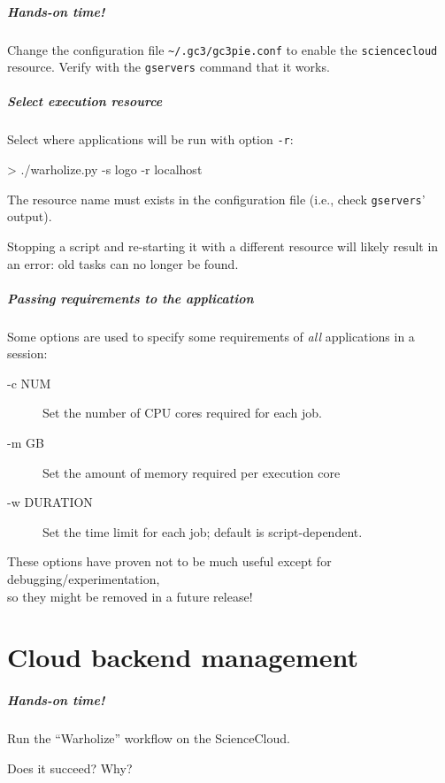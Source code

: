 \documentclass[english,serif,mathserif,usenames,dvipsnames]{beamer}
\begin{document}
\begin{frame}
  \frametitle{Hands-on time!}
  \begin{exercise}
    Change the configuration file
    \texttt{{\textasciitilde}/.gc3/gc3pie.conf} to enable the
    \texttt{sciencecloud} resource.  Verify with the \texttt{gservers}
    command that it works.
  \end{exercise}
\end{frame}


\begin{frame}
  \frametitle{Select execution resource}

  Select where applications will be run with option \texttt{-r}:
\begin{semiverbatim}
    > ./warholize.py -s logo -r localhost
\end{semiverbatim}

  \+ The resource name must exists in the configuration file (i.e.,
  check \texttt{gservers}' output).

  \+ Stopping a script and re-starting it with a different resource
  will likely result in an error: old tasks can no longer be found.
\end{frame}


\begin{frame}
  \frametitle{Passing requirements to the application}
  Some options are used to specify some requirements of \emph{all}
  applications in a session:
  \begin{description}
  \item[-c NUM] Set the number of CPU cores required for each job.
  \item[-m GB] Set the amount of memory required per execution core
  \item[-w DURATION] Set the time limit for each job; default is script-dependent.
  \end{description}

  \+ These options have proven not to be much useful except for
  debugging/experimentation, \\ so \alert{they might be removed in a
    future release!}
\end{frame}


\part{Cloud backend management}

\begin{frame}
  \frametitle{Hands-on time!}
  \begin{exercise}
    Run the ``Warholize'' workflow on the ScienceCloud.

    Does it succeed? Why?
  \end{exercise}
\end{frame}
\end{document}
